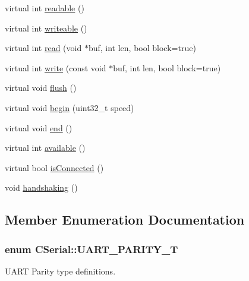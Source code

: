 \begin{DoxyCompactItemize}
\item 
virtual int \hyperlink{class_c_serial_a0748723f610ddcfdc34286dbbfbd4917}{readable} ()
\item 
virtual int \hyperlink{class_c_serial_ac59cfe80216e1fb7eb479017f0bb8e7f}{writeable} ()
\item 
virtual int \hyperlink{class_c_serial_a9b658bf4bc4d81413627bc2fe81e1471}{read} (void $\ast$buf, int len, bool block=true)
\item 
virtual int \hyperlink{class_c_serial_adef6d3e77843c65617b7cb555c2f8732}{write} (const void $\ast$buf, int len, bool block=true)
\item 
virtual void \hyperlink{class_c_serial_a68aecf6351423ae0e8791870c9e694bf}{flush} ()
\item 
virtual void \hyperlink{class_c_serial_a678403bcefc3bd7dfc603c334383b8df}{begin} (uint32\-\_\-t speed)
\item 
virtual void \hyperlink{class_c_serial_a4fb5a06c1d1f746c834088c8beeb3097}{end} ()
\item 
virtual int \hyperlink{class_c_serial_a5c142221c0841e7c961e962c45bd2db7}{available} ()
\item 
virtual bool \hyperlink{class_c_serial_ae7c133c4586cd5ca729cd026f813a8a0}{is\-Connected} ()
\item 
void \hyperlink{class_c_serial_a9dc5498e6cae5a2d0d12cb57fc6ee335}{handshaking} ()
\end{DoxyCompactItemize}


\subsection{Member Enumeration Documentation}
\hypertarget{class_c_serial_ad38b0926868c6cfabb59e2da94f1cf40}{
\subsubsection[{U\-A\-R\-T\-\_\-\-P\-A\-R\-I\-T\-Y\-\_\-\-T}]{\setlength{\rightskip}{0pt plus 5cm}enum {\bf C\-Serial\-::\-U\-A\-R\-T\-\_\-\-P\-A\-R\-I\-T\-Y\-\_\-\-T}}}\label{class_c_serial_ad38b0926868c6cfabb59e2da94f1cf40}


U\-A\-R\-T Parity type definitions. 


